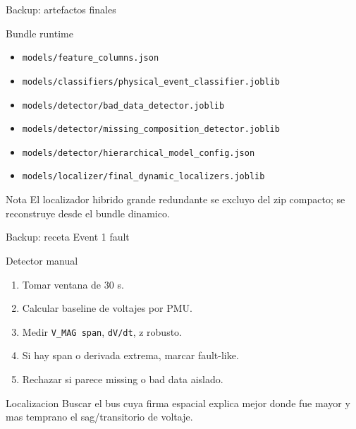 \documentclass[10pt,aspectratio=169]{beamer}
\newcommand{\code}[1]{\texttt{\footnotesize #1}}
\begin{document}
\begin{frame}{Backup: artefactos finales}
\small
\begin{block}{Bundle runtime}
\begin{itemize}
  \item \code{models/feature\_columns.json}
  \item \code{models/classifiers/physical\_event\_classifier.joblib}
  \item \code{models/detector/bad\_data\_detector.joblib}
  \item \code{models/detector/missing\_composition\_detector.joblib}
  \item \code{models/detector/hierarchical\_model\_config.json}
  \item \code{models/localizer/final\_dynamic\_localizers.joblib}
\end{itemize}
\end{block}
\begin{exampleblock}{Nota}
El localizador hibrido grande redundante se excluyo del zip compacto; se reconstruye desde el bundle dinamico.
\end{exampleblock}
\end{frame}

\begin{frame}{Backup: receta Event 1 fault}
\small
\begin{block}{Detector manual}
\begin{enumerate}
  \item Tomar ventana de 30 s.
  \item Calcular baseline de voltajes por PMU.
  \item Medir \code{V\_MAG span}, \code{dV/dt}, z robusto.
  \item Si hay span o derivada extrema, marcar fault-like.
  \item Rechazar si parece missing o bad data aislado.
\end{enumerate}
\end{block}
\begin{exampleblock}{Localizacion}
Buscar el bus cuya firma espacial explica mejor donde fue mayor y mas temprano el sag/transitorio de voltaje.
\end{exampleblock}
\end{frame}
\end{document}
